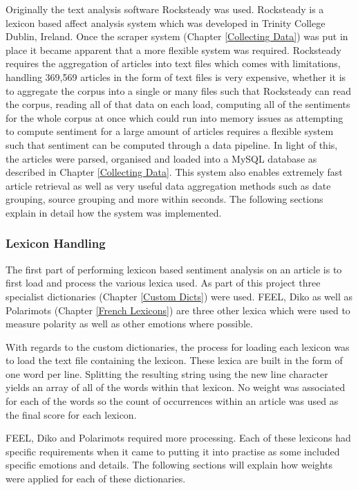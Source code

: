 Originally the text analysis software Rocksteady \cite{ahmad2014rocksteady} was used. Rocksteady is a lexicon based affect analysis system which was developed in Trinity College Dublin, Ireland. Once the scraper system (Chapter \ref{Collecting Data}) was put in place it became apparent that a more flexible system was required. Rocksteady requires the aggregation of articles into text files which comes with limitations, handling 369,569 articles in the form of text files is very expensive, whether it is to aggregate the corpus into a single or many files such that Rocksteady can read the corpus, reading all of that data on each load, computing all of the sentiments for the whole corpus at once which could run into memory issues as attempting to compute sentiment for a large amount of articles requires a flexible system such that sentiment can be computed through a data pipeline. In light of this, the articles were parsed, organised and loaded into a MySQL database as described in Chapter \ref{Collecting Data}. This system also enables extremely fast article retrieval as well as very useful data aggregation methods such as date grouping, source grouping and more within seconds. The following sections explain in detail how the system was implemented.
 
\subsubsection{Lexicon Handling}

The first part of performing lexicon based sentiment analysis on an article is to first load and process the various lexica used. As part of this project three specialist dictionaries (Chapter \ref{Custom Dicts}) were used. FEEL, Diko as well as Polarimots (Chapter \ref{French Lexicons}) are three other lexica which were used to measure polarity as well as other emotions where possible.

With regards to the custom dictionaries, the process for loading each lexicon was to load the text file containing the lexicon. These lexica are built in the form of one word per line. Splitting the resulting string using the new line character yields an array of all of the words within that lexicon. No weight was associated for each of the words so the count of occurrences within an article was used as the final score for each lexicon.

FEEL, Diko and Polarimots required more processing. Each of these lexicons had specific requirements when it came to putting it into practise as some included specific emotions and details. The following sections will explain how weights were applied for each of these dictionaries.

